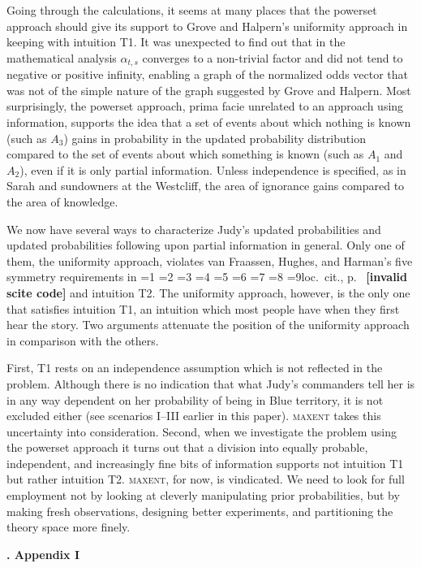 \documentclass[12pt]{article}
\newcommand{\kapt}[1]{\noindent \textbf{{\thechap}. #1}\addtocounter{chap}{1}}
\newif\ifNumericalOrYear
\newcommand{\PageP}{p.~}
\newcommand{\PageP}{}
\newcommand{\scite}[3]{\ifnum#1=1\ifNumericalOrYear\citep{#2}\else\citeyearpar{#2}\fi\else
\ifnum#1=2\ifNumericalOrYear\citep[#3]{#2}\else\citep[{\PageP}#3]{#2}\fi\else
\ifnum#1=3\ifNumericalOrYear(\citet[#3]{#2})\else\citep[{\PageP}#3]{#2}\fi\else
\ifnum#1=4\ifNumericalOrYear\citet{#2}\else\citet{#2}\fi\else
\ifnum#1=5\ifNumericalOrYear(\citet{#2})\else\citep{#2}\fi\else
\ifnum#1=6\ifNumericalOrYear(\citet[#3]{#2})\else\citep[{\PageP}#3]{#2}\fi\else
\ifnum#1=7\ifNumericalOrYear\citep{#2}\else\citealp{#2}\fi\else
\ifnum#1=8\ifNumericalOrYear\citep[#3]{#2}\else\citealp[{\PageP}#3]{#2}\fi\else
\ifnum#1=9\ifNumericalOrYear\citep[#3]{#2}\else{}loc.\ cit., {\PageP}#3\fi\else
\textbf{[invalid scite code]}\fi\fi\fi\fi\fi\fi\fi\fi\fi}
\begin{document}
Going through the calculations, it seems at many places that the
powerset approach should give its support to Grove and Halpern's
uniformity approach in keeping with intuition T1. It was unexpected to
find out that in the mathematical analysis $\alpha_{t,s}$ converges to
a non-trivial factor and did not tend to negative or positive
infinity, enabling a graph of the normalized odds vector that was not
of the simple nature of the graph suggested by Grove and Halpern. Most
surprisingly, the powerset approach, prima facie unrelated to an
approach using information, supports the idea that a set of events
about which nothing is known (such as $A_{3}$) gains in probability in
the updated probability distribution compared to the set of events
about which something is known (such as $A_{1}$ and $A_{2}$), even if
it is only partial information. Unless independence is specified, as
in Sarah and sundowners at the Westcliff, the area of ignorance gains
compared to the area of knowledge.

We now have several ways to characterize Judy's updated
probabilities and updated probabilities following upon partial
information in general. Only one of them, the uniformity approach,
violates van Fraassen, Hughes, and Harman's five symmetry requirements
in \scite{1}{fraassenetal86}{} and intuition T2. The uniformity
approach, however, is the only one that satisfies intuition T1, an
intuition which most people have when they first hear the story. Two
arguments attenuate the position of the uniformity approach in
comparison with the others. 

First, T1 rests on an independence assumption which is not reflected
in the problem. Although there is no indication that what Judy's
commanders tell her is in any way dependent on her probability of
being in Blue territory, it is not excluded either (see scenarios
I--III earlier in this paper). \textsc{maxent} takes this uncertainty
into consideration. Second, when we investigate the problem using the
powerset approach it turns out that a division into equally probable,
independent, and increasingly fine bits of information supports not
intuition T1 but rather intuition T2. \textsc{maxent}, for now, is
vindicated. We need to look for full employment not by looking at
cleverly manipulating prior probabilities, but by making fresh
observations, designing better experiments, and partitioning the
theory space more finely.

\newpage

\kapt{Appendix I}
\end{document}
